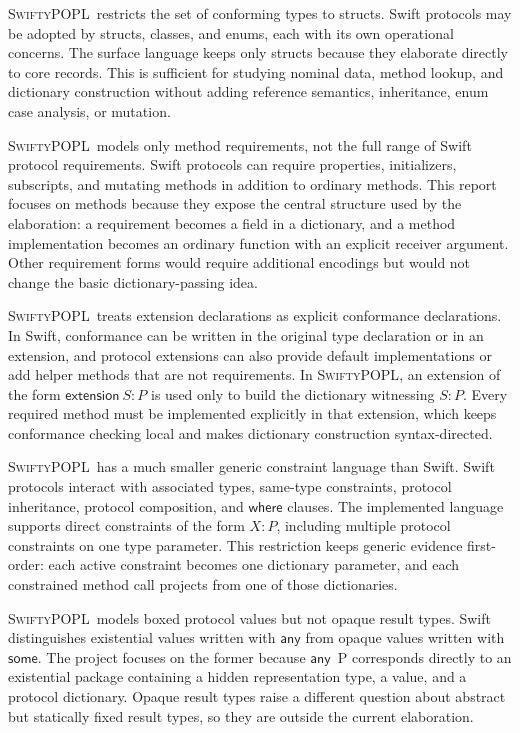\documentclass[manuscript,nonacm]{acmart}
\newcommand{\lang}{\textsc{SwiftyPOPL}}
\newcommand{\kw}[1]{\ensuremath{\mathsf{#1}}}
\newcommand{\Any}[1]{\kw{any}\ #1}
\begin{document}
\lang\ restricts the set of conforming types to structs.
Swift protocols may be adopted by structs, classes, and enums, each with its own operational concerns.
The surface language keeps only structs because they elaborate directly to core records.
This is sufficient for studying nominal data, method lookup, and dictionary construction without adding reference semantics, inheritance, enum case analysis, or mutation.

\lang\ models only method requirements, not the full range of Swift protocol requirements.
Swift protocols can require properties, initializers, subscripts, and mutating methods in addition to ordinary methods.
This report focuses on methods because they expose the central structure used by the elaboration:
a requirement becomes a field in a dictionary, and a method implementation becomes an ordinary function with an explicit receiver argument.
Other requirement forms would require additional encodings but would not change the basic dictionary-passing idea.

\lang\ treats extension declarations as explicit conformance declarations.
In Swift, conformance can be written in the original type declaration or in an extension, and protocol extensions can also provide default implementations or add helper methods that are not requirements.
In \lang, an extension of the form $\kw{extension}\ S:P$ is used only to build the dictionary witnessing $S:P$.
Every required method must be implemented explicitly in that extension, which keeps conformance checking local and makes dictionary construction syntax-directed.

\lang\ has a much smaller generic constraint language than Swift.
Swift protocols interact with associated types, same-type constraints, protocol inheritance, protocol composition, and \kw{where} clauses.
The implemented language supports direct constraints of the form $X:P$, including multiple protocol constraints on one type parameter.
This restriction keeps generic evidence first-order:
each active constraint becomes one dictionary parameter, and each constrained method call projects from one of those dictionaries.

\lang\ models boxed protocol values but not opaque result types.
Swift distinguishes existential values written with \kw{any} from opaque values written with \kw{some}.
The project focuses on the former because \Any{P} corresponds directly to an existential package containing a hidden representation type, a value, and a protocol dictionary.
Opaque result types raise a different question about abstract but statically fixed result types, so they are outside the current elaboration.
\end{document}
